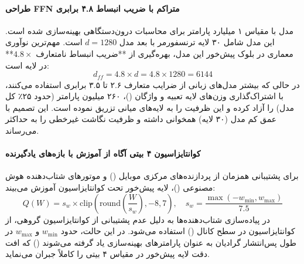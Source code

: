 \item {}

\paragraph*{طراحی FFN متراکم با ضریب انبساط ۴.۸ برابری}
مدل  \cite{mobilellmpro2025} با مقیاس ۱ میلیارد پارامتر برای محاسبات درون‌دستگاهی بهینه‌سازی شده است. این مدل شامل ۳۰ لایه ترنسفورمر با بعد مدل $d = 1280$ است. مهم‌ترین نوآوری معماری در بلوک پیش‌خور این مدل، بهره‌گیری از **ضریب انبساط نامتعارف $4.8\times$** در لایه  است:
\begin{equation}
    d_{ff} = 4.8 \times d = 4.8 \times 1280 = 6144
\end{equation}
در حالی که بیشتر مدل‌های زبانی از ضرایب متعارف ۲.۶ تا ۳.۵ برابری استفاده می‌کنند،  با اشتراک‌گذاری وزن‌های لایه تعبیه و واژگان ()، ۲۶۰ میلیون پارامتر (حدود ۲۵٪ کل مدل) را آزاد کرده و این ظرفیت را به لایه‌های میانی  تزریق نموده است. این تصمیم با عمق کم مدل (۳۰ لایه) همخوانی داشته و ظرفیت نگاشت غیرخطی را به حداکثر می‌رساند.

\paragraph*{کوانتایزاسیون ۴ بیتی آگاه از آموزش با بازه‌های یادگیرنده}
برای پشتیبانی همزمان از پردازنده‌های مرکزی موبایل () و موتورهای شتاب‌دهنده هوش مصنوعی ()، لایه پیش‌خور تحت کوانتایزاسیون  آموزش می‌بیند:
\begin{equation}
    Q(W) = s_w \times \text{clip}\left( \text{round}\left(\frac{W}{s_w}\right), -8, 7 \right), \quad s_w = \frac{\max(-w_{\min}, w_{\max})}{7.5}
\end{equation}
در پیاده‌سازی شتاب‌دهنده‌ها به دلیل عدم پشتیبانی از کوانتایزاسیون گروهی، از کوانتایزاسیون در سطح کانال () استفاده می‌شود. در این حالت، حدود $w_{\min}$ و $w_{\max}$ در طول پس‌انتشار گرادیان به عنوان پارامترهای بهینه‌سازی یاد گرفته می‌شوند () که افت دقت لایه پیش‌خور در مقیاس ۴ بیتی را کاملاً جبران می‌نماید.

